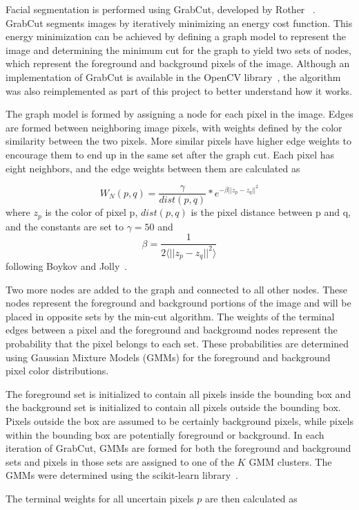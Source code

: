 \documentclass[10pt,twocolumn,letterpaper]{article}
\begin{document}
Facial segmentation is performed using GrabCut, developed by Rother \etal~\cite{Rother:2004aa}. GrabCut segments images by iteratively minimizing an energy cost function. This energy minimization can be achieved by defining a graph model to represent the image and determining the minimum cut for the graph to yield two sets of nodes, which represent the foreground and background pixels of the image. Although an implementation of GrabCut is available in the OpenCV library~\cite{opencv_library}, the algorithm was also reimplemented as part of this project to better understand how it works.

The graph model is formed by assigning a node for each pixel in the image. Edges are formed between neighboring image pixels, with weights defined by the color similarity between the two pixels. More similar pixels have higher edge weights to encourage them to end up in the same set after the graph cut. Each pixel has eight neighbors, and the edge weights between them are calculated as

$$ W_N(p,q) = \frac{\gamma}{dist(p,q)} * e^{-\beta ||z_p-z_q||^2}$$ 
where $z_p$ is the color of pixel p, $dist(p,q)$ is the pixel distance between p and q, and the constants are set to $\gamma = 50$ and 
$$\beta = \frac{1}{2 \langle ||z_p-z_q||^2\rangle}$$
following Boykov and Jolly~\cite{Boykov:2001aa}.

Two more nodes are added to the graph and connected to all other nodes. These nodes represent the foreground and background portions of the image and will be placed in opposite sets by the min-cut algorithm. The weights of the terminal edges between a pixel and the foreground and background nodes represent the probability that the pixel belongs to each set. These probabilities are determined using Gaussian Mixture Models (GMMs) for the foreground and background pixel color distributions.

The foreground set is initialized to contain all pixels inside the bounding box and the background set is initialized to contain all pixels outside the bounding box. Pixels outside the box are assumed to be certainly background pixels, while pixels within the bounding box are potentially foreground or background. In each iteration of GrabCut, GMMs are formed for both the foreground and background sets and pixels in those sets are assigned to one of the $K$ GMM clusters. The GMMs were determined using the scikit-learn library~\cite{scikit-learn}.

The terminal weights for all uncertain pixels $p$ are then calculated as
\end{document}
